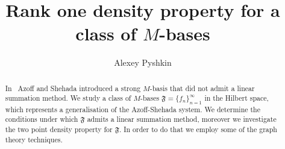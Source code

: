 \documentclass[12pt]{amsart}
\begin{document}
  \title{Rank one density property for a class of $M$-bases}
  \author{Alexey Pyshkin}
  \begin{abstract}
    In~\cite{azoff} Azoff and Shehada introduced a strong $M$-basis that did not admit a linear summation method.
    We study a class of $M$-bases $\mathfrak{F}=\{f_n\}_{n=1}^\infty$ in the Hilbert space, which
      represents a generalisation of the Azoff-Shehada system.
    We determine the conditions under which $\mathfrak{F}$ admits a linear summation method, moreover
      we investigate the two point density property for $\mathfrak{F}$.
    In order to do that we employ some of the graph theory techniques.
  \end{abstract}
  \maketitle
\end{document}
